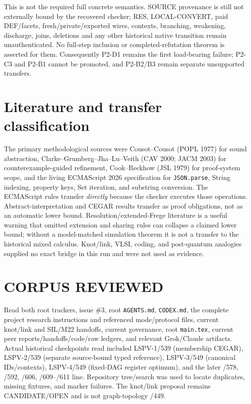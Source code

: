 \documentclass[11pt]{article}
\begin{document}
This is not the required full concrete semantics.  SOURCE provenance is still not externally bound by the recovered checker; RES, LOCAL-CONVERT, paid DEF/facets, fresh/private/exported wires, contexts, branching, weakening, discharge, joins, deletions and any other historical native transition remain unauthenticated.  No full-step inclusion or completed-refutation theorem is asserted for them.  Consequently P2-D1 remains the first load-bearing failure; P2-C3 and P2-B1 cannot be promoted, and P2-B2/B3 remain separate unsupported transfers.

\section{Literature and transfer classification}
The primary methodological sources were Cousot--Cousot (POPL 1977) for sound abstraction, Clarke--Grumberg--Jha--Lu--Veith (CAV 2000; JACM 2003) for counterexample-guided refinement, Cook--Reckhow (JSL 1979) for proof-system scope, and the living ECMAScript 2026 specification for \texttt{JSON.parse}, String indexing, property keys, Set iteration, and substring conversion.  The ECMAScript rules transfer \emph{directly} because the checker executes those operations.  Abstract-interpretation and CEGAR results transfer as proof obligations, not as an automatic lower bound.  Resolution/extended-Frege literature is a useful warning that omitted extension and sharing rules can collapse a claimed lower bound; without a model-matched simulation theorem it is not a transfer to the historical mixed calculus.  Knot/link, VLSI, coding, and post-quantum analogies supplied no exact bridge in this run and were not used as evidence.

\section{CORPUS REVIEWED}
Read both root trackers, issue \#3, root \texttt{AGENTS.md}, \texttt{CODEX.md}, the complete project research instructions and referenced mode/protocol files, current knot/link and SIL/M22 handoffs, current governance, root \texttt{main.tex}, current peer reports/handoffs/code/raw ledgers, and relevant Grok/Claude artifacts.  Actual historical checkpoints read included LSPV-1/539 (membership CEGAR), LSPV-2/539 (separate source-bound typed reference), LSPV-3/549 (canonical IDs/contexts), LSPV-4/549 (fixed-DAG register optimum), and the later /578, /592, /606, /609--/611 line.  Repository tree/search was used to locate duplicates, missing fixtures, and marker failures.  The knot/link proposal remains CANDIDATE/OPEN and is not graph-topology /449.
\end{document}
